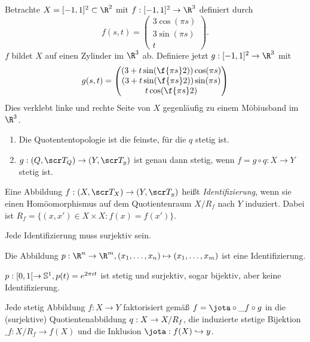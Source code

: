 \begin{ex}
	Betrachte $X = [-1,1]^2 \subset \R^2$ mit $f: [-1,1]^2 \to \R^3$ definiert durch
	\[
		f(s, t) = \begin{pmatrix}
			3 \cos(\pi s) \\
			3 \sin(\pi s) \\
			t
		\end{pmatrix}.
	\]
	$f$ bildet $X$ auf einen Zylinder im $\R^3$ ab.
	Definiere jetzt $g: [-1,1]^2 \to \R^3$ mit
	\[
		g(s, t) = \begin{pmatrix}
			(3 + t \sin(\f{\pi s}2)) \cos (\pi s) \\
			(3 + t \sin(\f{\pi s}2)) \sin (\pi s) \\
			t \cos(\f {\pi s}2)
		\end{pmatrix}
	\]
	Dies verklebt linke und rechte Seite von $X$ gegenläufig zu einem Möbiusband im $\R^3$.
\end{ex}

\begin{st}
	\begin{enumerate}[(1)]
		\item
			Die Quotententopologie ist die feinste, für die $q$ stetig ist.
		\item
			$g: (Q, \scr T_Q) \to (Y, \scr T_y)$ ist genau dann stetig, wenn $f = g \circ q: X \to Y$ stetig ist.
	\end{enumerate}
\end{st}

\begin{df}
	Eine Abbildung $f: (X, \scr T_X) \to (Y, \scr T_y)$ heißt \emph{Identifizierung}, wenn sie einen Homöomorphismus auf dem Quotientenraum $X / R_f$ nach $Y$ induziert.
	Dabei ist $R_f = \{ (x,x') \in X \times X : f(x) = f(x') \}$.
	\begin{note}
		Jede Identifizierung muss surjektiv sein.
	\end{note}
\end{df}

\begin{ex}
	Die Abbildung $p: \R^n \to \R^m, (x_1, \dotsc, x_n) \mapsto (x_1, \dotsc, x_m)$ ist eine Identifizierung.
\end{ex}

\begin{ex}
	$p: [0,1[ \to \S^1, p(t) = e^{2\pi i t}$ ist stetig und surjektiv, sogar bijektiv, aber keine Identifizierung.
\end{ex}

\begin{st}
	Jede stetig Abbildung $f: X \to Y$ faktorisiert gemäß $f = \jota \circ \_f \circ g$ in die (surjektive) Quotientenabbildung $q: X \surto X / R_f$, die induzierte stetige Bijektion $\_f: X / R_f \to f(X)$ und die Inklusion $\jota: f(X) \injto y$.
\end{st}


